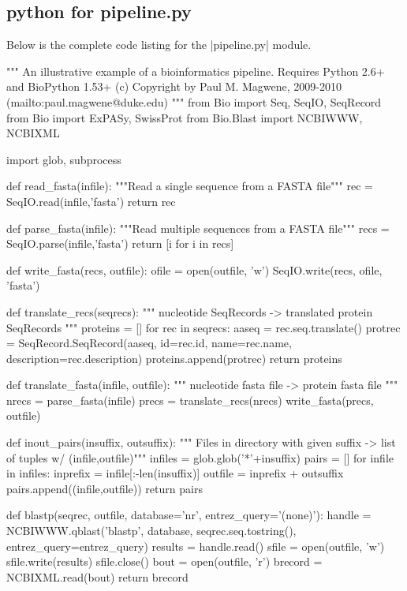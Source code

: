 \documentclass[10pt,letterpaper]{scrartcl}
\begin{document}
\subsection*{python for pipeline.py}
Below is the complete code listing for the |pipeline.py| module.

\bigskip

\begin{python}
"""
An illustrative example of a bioinformatics pipeline.
Requires Python 2.6+ and BioPython 1.53+
(c) Copyright by Paul M. Magwene, 2009-2010  (mailto:paul.magwene@duke.edu)
"""
from Bio import Seq, SeqIO, SeqRecord
from Bio import ExPASy, SwissProt
from Bio.Blast import NCBIWWW, NCBIXML
    
import glob, subprocess

def read_fasta(infile):
    """Read a single sequence from a FASTA file"""
    rec = SeqIO.read(infile,'fasta')
    return rec

def parse_fasta(infile):
    """Read multiple sequences from a FASTA file"""
    recs = SeqIO.parse(infile,'fasta')
    return [i for i in recs] 
    
def write_fasta(recs, outfile):
    ofile = open(outfile, 'w')
    SeqIO.write(recs, ofile, 'fasta')    
    
def translate_recs(seqrecs):
    """ nucleotide SeqRecords -> translated protein SeqRecords """ 
    proteins = []
    for rec in seqrecs:
        aaseq = rec.seq.translate()
        protrec = SeqRecord.SeqRecord(aaseq, id=rec.id, name=rec.name, 
        			      description=rec.description)
        proteins.append(protrec)
    return proteins    
    
def translate_fasta(infile, outfile):
    """ nucleotide fasta file -> protein fasta file """
    nrecs = parse_fasta(infile)
    precs = translate_recs(nrecs)
    write_fasta(precs, outfile)    

def inout_pairs(insuffix, outsuffix):
    """ Files in directory with given suffix -> list of tuples w/ (infile,outfile)"""
    infiles = glob.glob('*'+insuffix)
    pairs = []
    for infile in infiles:
        inprefix = infile[:-len(insuffix)]
        outfile = inprefix + outsuffix
        pairs.append((infile,outfile))
    return pairs     
    
def blastp(seqrec, outfile, database='nr', entrez_query='(none)'):
    handle = NCBIWWW.qblast('blastp', database, seqrec.seq.tostring(), 
    				entrez_query=entrez_query)
    results = handle.read()
    sfile = open(outfile, 'w')
    sfile.write(results)
    sfile.close()   
    bout = open(outfile, 'r')
    brecord = NCBIXML.read(bout)    
    return brecord


\end{python}
\end{document}
